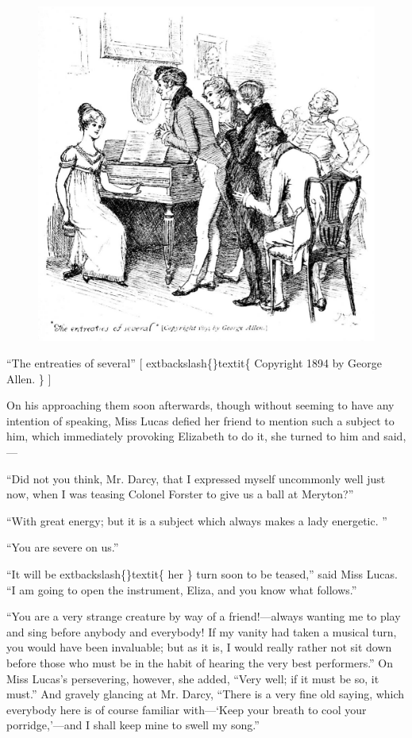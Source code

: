 \documentclass[10pt]{book}
\begin{document}
\begin{figure}[h]
\centering
\includegraphics[width=\linewidth]{images/i_060.jpg}
\end{figure}

     “The entreaties of several” [
     	extbackslash\{\}textit\{
      Copyright 1894 by George
Allen.
     \}
     ]
    

   On his approaching them soon afterwards, though without seeming to have
any intention of speaking, Miss Lucas defied her friend to mention such
a subject to him, which immediately provoking Elizabeth to do it, she
turned to him and said,—
  

   “Did not you think, Mr. Darcy, that I expressed myself uncommonly well
just now, when I was teasing Colonel Forster to give us a ball at
Meryton?”
  

   “With great energy; but it is a subject which always makes a lady
energetic.
   ”
  

   “You are severe on us.”
  

   “It will be
   	extbackslash\{\}textit\{
    her
   \}
   turn soon to be teased,” said Miss Lucas. “I am going
to open the instrument, Eliza, and you know what follows.”
  

   “You are a very strange creature by way of a friend!—always wanting me
to play and sing before anybody and everybody! If my vanity had taken a
musical turn, you would have been invaluable; but as it is, I would
really rather not sit down before those who must be in the habit of
hearing the very best performers.” On Miss Lucas’s persevering, however,
she added, “Very well; if it must be so, it must.” And gravely glancing
at Mr. Darcy, “There is a very fine old saying, which everybody here is
of course familiar with—‘Keep your breath to cool your porridge,’—and
I shall keep mine to swell my song.”
  
\end{document}
